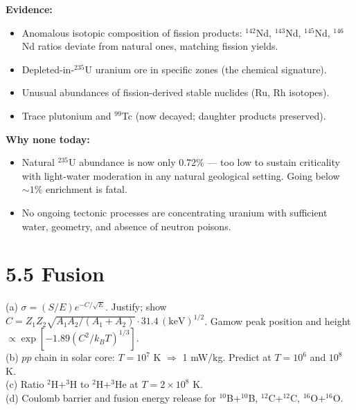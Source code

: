 \documentclass[11pt]{article}
\newcommand{\Q}[1]{\begin{question}#1\end{question}}
\begin{document}
\textbf{Evidence:}
\begin{itemize}[itemsep=1pt]
\item Anomalous isotopic composition of fission products: $^{142}$Nd, $^{143}$Nd, $^{145}$Nd, $^{146}$Nd ratios deviate from natural ones, matching fission yields.
\item Depleted-in-$^{235}$U uranium ore in specific zones (the chemical signature).
\item Unusual abundances of fission-derived stable nuclides (Ru, Rh isotopes).
\item Trace plutonium and $^{99}$Tc (now decayed; daughter products preserved).
\end{itemize}

\textbf{Why none today:}
\begin{itemize}[itemsep=1pt]
\item Natural $^{235}$U abundance is now only 0.72\% — too low to sustain criticality with light-water moderation in any natural geological setting. Going below $\sim 1\%$ enrichment is fatal.
\item No ongoing tectonic processes are concentrating uranium with sufficient water, geometry, and absence of neutron poisons.
\end{itemize}

\section*{5.5 \quad Fusion}

\Q{(a) $\sigma=(S/E)e^{-C/\sqrt E}$. Justify; show $C=Z_1 Z_2\sqrt{A_1 A_2/(A_1+A_2)}\cdot 31.4\,\mathrm{(keV)}^{1/2}$. Gamow peak position and height $\propto\exp[-1.89(C^{2}/k_B T)^{1/3}]$.\\
(b) $pp$ chain in solar core: $T=10^{7}$ K $\Rightarrow$ 1 mW/kg. Predict at $T=10^{6}$ and $10^{8}$ K.\\
(c) Ratio $^{2}$H+$^{3}$H to $^{2}$H+$^{3}$He at $T=2\times 10^{8}$ K.\\
(d) Coulomb barrier and fusion energy release for $^{10}$B+$^{10}$B, $^{12}$C+$^{12}$C, $^{16}$O+$^{16}$O.}
\end{document}

